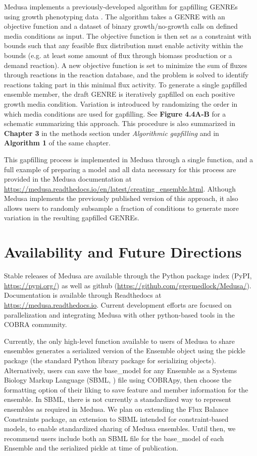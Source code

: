 \documentclass[11pt,onecolumn,notitlepage,openany,twoside]{book}
\begin{document}
\begin{refsection}
Medusa implements a previously-developed algorithm for gapfilling GENREs using growth phenotyping data \cite{Biggs2017-md,Medlock2018-kx}. The algorithm takes a GENRE with an objective function and a dataset of binary growth/no-growth calls on defined media conditions as input. The objective function is then set as a constraint with bounds such that any feasible flux distribution must enable activity within the bounds (e.g. at least some amount of flux through biomass production or a demand reaction). A new objective function is set to minimize the sum of fluxes through reactions in the reaction database, and the problem is solved to identify reactions taking part in this minimal flux activity. To generate a single gapfilled ensemble member, the draft GENRE is iteratively gapfilled on each positive growth media condition. Variation is introduced by randomizing the order in which media conditions are used for gapfilling. See \textbf{Figure 4.4A-B} for a schematic summarizing this approach. This procedure is also summarized in \textbf{Chapter 3} in the methods section under \textit{Algorithmic gapfilling} and in \textbf{Algorithm 1} of the same chapter.

This gapfilling process is implemented in Medusa through a single function, and a full example of preparing a model and all data necessary for this process are provided in the Medusa documentation at \url{https://medusa.readthedocs.io/en/latest/creating_ensemble.html}. Although Medusa implements the previously published version of this approach, it also allows users to randomly subsample a fraction of conditions to generate more variation in the resulting gapfilled GENREs.

\section{Availability and Future Directions}

Stable releases of Medusa are available through the Python package index (PyPI, \url{https://pypi.org/}) as well as github (\url{https://github.com/gregmedlock/Medusa/}). Documentation is available through Readthedocs at \url{https://medusa.readthedocs.io}. Current development efforts are focused on parallelization and integrating Medusa with other python-based tools in the COBRA community.

Currently, the only high-level function available to users of Medusa to share ensembles generates a serialized version of the Ensemble object using the pickle package (the standard Python library package for serializing objects). Alternatively, users can save the base\_model for any Ensemble as a Systems Biology Markup Language (SBML, \cite{Hucka2003-io}) file using COBRApy, then choose the formatting option of their liking to save feature and member information for the ensemble. In SBML, there is not currently a standardized way to represent ensembles as required in Medusa. We plan on extending the Flux Balance Constraints package, an extension to SBML intended for constraint-based models, to enable standardized sharing of Medusa ensembles. Until then, we recommend users include both an SBML file for the base\_model of each Ensemble and the serialized pickle at time of publication.


\end{refsection}
\end{document}
